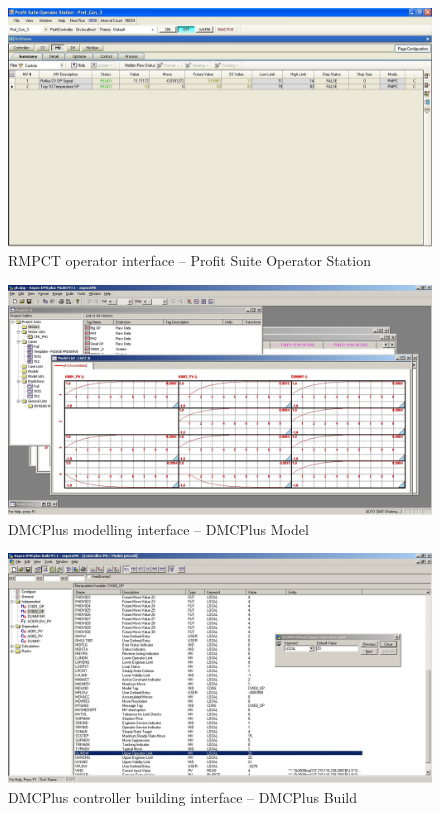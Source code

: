 \begin{landscape}
  \begin{figure}[htbp]
    \centering
      \includegraphics[width=25cm]{graph/ss_rmpctpsos.jpg}
    \caption[RMPCT Profit Suite Operator Station interface]{RMPCT operator interface -- Profit Suite Operator Station}
    \label{fig:ssrmpctoperator}
  \end{figure}

  \begin{figure}[htbp]
    \centering
      \includegraphics[width=25cm]{graph/ss_dmcplusdmcmodel.jpg}
    \caption[DMCPlus Model interface]{DMCPlus modelling interface -- DMCPlus Model}
    \label{fig:ssdmcplusmodel}
  \end{figure}

  \begin{figure}[htbp]
    \centering
      \includegraphics[width=25cm]{graph/ss_dmcplusdmcbuild.jpg}
    \caption[DMCPlus Build interface]{DMCPlus controller building interface -- DMCPlus Build}
    \label{fig:ssdmcpluscontrolbuild}
  \end{figure}


\end{landscape}
